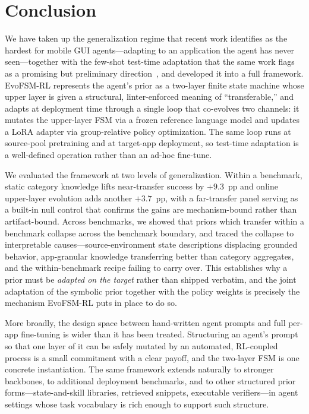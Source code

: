 \section{Conclusion}
\label{sec:conclusion}

We have taken up the generalization regime that recent work identifies as the
hardest for mobile GUI agents---adapting to an application the agent has never
seen---together with the few-shot test-time adaptation that the same work flags
as a promising but preliminary direction~\citep{gu2026generalization}, and
developed it into a full framework. EvoFSM-RL represents the agent's prior as a
two-layer finite state machine whose upper layer is given a structural,
linter-enforced meaning of ``transferable,'' and adapts at deployment time
through a single loop that co-evolves two channels: it mutates the upper-layer
FSM via a frozen reference language model and updates a LoRA adapter via
group-relative policy optimization. The same loop runs at source-pool
pretraining and at target-app deployment, so test-time adaptation is a
well-defined operation rather than an ad-hoc fine-tune.

We evaluated the framework at two levels of generalization. Within a benchmark,
static category knowledge lifts near-transfer success by $+9.3$~pp and online
upper-layer evolution adds another $+3.7$~pp, with a far-transfer panel serving
as a built-in null control that confirms the gains are mechanism-bound rather
than artifact-bound. Across benchmarks, we showed that priors which transfer
within a benchmark collapse across the benchmark boundary, and traced the
collapse to interpretable causes---source-environment state descriptions
displacing grounded behavior, app-granular knowledge transferring better than
category aggregates, and the within-benchmark recipe failing to carry over. This
establishes why a prior must be \emph{adapted on the target} rather than shipped
verbatim, and the joint adaptation of the symbolic prior together with the policy
weights is precisely the mechanism EvoFSM-RL puts in place to do so.

More broadly, the design space between hand-written agent prompts and full
per-app fine-tuning is wider than it has been treated. Structuring an agent's
prompt so that one layer of it can be safely mutated by an automated,
RL-coupled process is a small commitment with a clear payoff, and the two-layer
FSM is one concrete instantiation. The same framework extends naturally to
stronger backbones, to additional deployment benchmarks, and to other structured
prior forms---state-and-skill libraries, retrieved snippets, executable
verifiers---in agent settings whose task vocabulary is rich enough to support
such structure.

